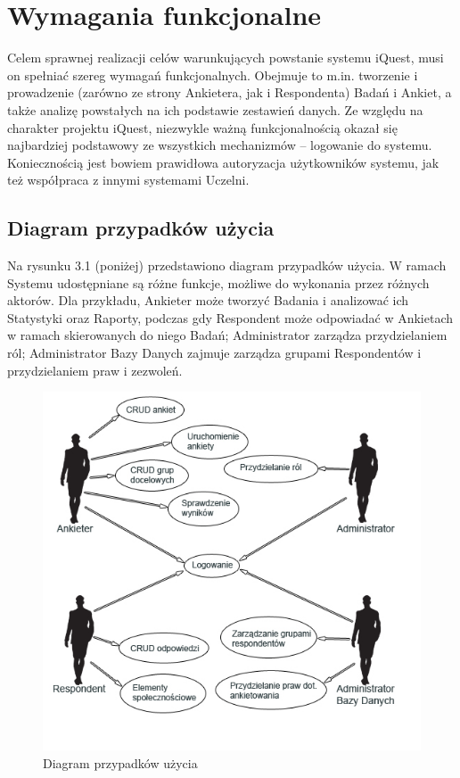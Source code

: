 \chapter{Wymagania funkcjonalne}
\label{Chapter3}

Celem sprawnej realizacji celów warunkujących powstanie systemu iQuest, musi on spełniać szereg wymagań funkcjonalnych. Obejmuje to m.in. tworzenie i prowadzenie (zarówno ze strony Ankietera, jak i Respondenta) Badań i Ankiet, a także analizę powstałych na ich podstawie zestawień danych. Ze względu na charakter projektu iQuest, niezwykle ważną funkcjonalnością okazał się najbardziej podstawowy ze wszystkich mechanizmów -- logowanie do systemu. Koniecznością jest bowiem prawidłowa autoryzacja użytkowników systemu, jak też współpraca z innymi systemami Uczelni.

\section{Diagram przypadków użycia}

Na rysunku 3.1 (poniżej) przedstawiono diagram przypadków użycia. W ramach Systemu udostępniane są różne funkcje, możliwe do wykonania przez różnych aktorów. Dla przykładu, Ankieter może tworzyć Badania i analizować ich Statystyki oraz Raporty, podczas gdy Respondent może odpowiadać w Ankietach w ramach skierowanych do niego Badań; Administrator zarządza przydzielaniem ról; Administrator Bazy Danych zajmuje zarządza grupami Respondentów i przydzielaniem praw i zezwoleń.

\begin{figure}[H]
\centering\includegraphics[width=15cm]{figures/UseCaseView}
\caption{Diagram przypadków użycia}\label{rys:usecase}
\end{figure}

